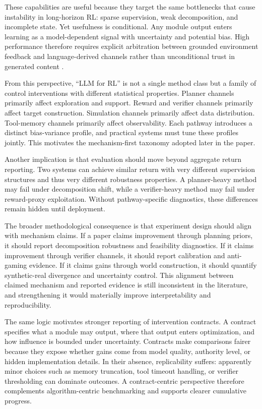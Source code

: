 \documentclass[pdflatex,sn-mathphys-num]{sn-jnl}
\begin{document}
These capabilities are useful because they target the same bottlenecks that cause instability in long-horizon RL: sparse supervision, weak decomposition, and incomplete state. Yet usefulness is conditional. Any module output enters learning as a model-dependent signal with uncertainty and potential bias. High performance therefore requires explicit arbitration between grounded environment feedback and language-derived channels rather than unconditional trust in generated content \cite{arxiv_p_2602_06493,arxiv_p_2602_12579,arxiv_p_2601_06845,arxiv_p_2601_22511}.

From this perspective, ``LLM for RL'' is not a single method class but a family of control interventions with different statistical properties. Planner channels primarily affect exploration and support. Reward and verifier channels primarily affect target construction. Simulation channels primarily affect data distribution. Tool-memory channels primarily affect observability. Each pathway introduces a distinct bias-variance profile, and practical systems must tune these profiles jointly. This motivates the mechanism-first taxonomy adopted later in the paper.

Another implication is that evaluation should move beyond aggregate return reporting. Two systems can achieve similar return with very different supervision structures and thus very different robustness properties. A planner-heavy method may fail under decomposition shift, while a verifier-heavy method may fail under reward-proxy exploitation. Without pathway-specific diagnostics, these differences remain hidden until deployment.

The broader methodological consequence is that experiment design should align with mechanism claims. If a paper claims improvement through planning priors, it should report decomposition robustness and feasibility diagnostics. If it claims improvement through verifier channels, it should report calibration and anti-gaming evidence. If it claims gains through world construction, it should quantify synthetic-real divergence and uncertainty control. This alignment between claimed mechanism and reported evidence is still inconsistent in the literature, and strengthening it would materially improve interpretability and reproducibility.

The same logic motivates stronger reporting of intervention contracts. A contract specifies what a module may output, where that output enters optimization, and how influence is bounded under uncertainty. Contracts make comparisons fairer because they expose whether gains come from model quality, authority level, or hidden implementation details. In their absence, replicability suffers: apparently minor choices such as memory truncation, tool timeout handling, or verifier thresholding can dominate outcomes. A contract-centric perspective therefore complements algorithm-centric benchmarking and supports clearer cumulative progress.
\end{document}
